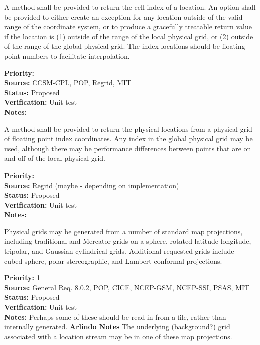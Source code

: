 A method shall be provided to return the cell index of a location.  An option shall
be provided to either create an exception for any location outside of the valid
range of the coordinate system, or to produce a gracefully treatable return value if
the location is (1) outside of the range of the local physical grid, or (2) outside of the
range of the global physical grid.  The index locations should be floating point numbers to
facilitate interpolation.
\begin{reqlist}
{\bf Priority:} \\
{\bf Source:} CCSM-CPL, POP, Regrid, MIT \\
{\bf Status:} Proposed \\
{\bf Verification:} Unit test \\
{\bf Notes:} 
\end{reqlist}

A method shall be provided to return the physical locations from a physical grid of
floating point index coordinates.  Any index in the global physical grid may be
used, although there may be performance differences between points that are on
and off of the local physical grid.
\begin{reqlist}
{\bf Priority:} \\
{\bf Source:} Regrid (maybe - depending on implementation) \\
{\bf Status:} Proposed \\
{\bf Verification:} Unit test \\
{\bf Notes:} 
\end{reqlist}


Physical grids may be generated from a number of standard map projections, including
traditional and Mercator grids on a sphere, rotated latitude-longitude,
tripolar, and Gaussian cylindrical grids.  Additional requested grids include 
cubed-sphere, polar stereographic, and Lambert conformal projections.
\begin{reqlist}
{\bf Priority:} 1 \\
{\bf Source:} General Req. 8.0.2, POP, CICE, NCEP-GSM, NCEP-SSI,
PSAS, MIT \\
{\bf Status:} Proposed \\
{\bf Verification:} Unit test\\
{\bf Notes:}  Perhaps some of these should be read in from a file, rather than
internally generated.
{\bf Arlindo Notes} The underlying (background?) grid associated with a location stream may be in one of these map projections.
\end{reqlist}

